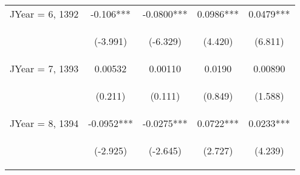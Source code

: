 \documentclass[]{standalone}
\begin{document}
\begin{tabular}{lcccc}
    JYear = 6, 1392  & -0.106***                                      & -0.0800***                                     & 0.0986***                                      & 0.0479***                                      \\
    \vspace{4pt}     & \begin{footnotesize}(-3.991)\end{footnotesize} & \begin{footnotesize}(-6.329)\end{footnotesize} & \begin{footnotesize}(4.420)\end{footnotesize}  & \begin{footnotesize}(6.811)\end{footnotesize}  \\
    JYear = 7, 1393  & 0.00532                                        & 0.00110                                        & 0.0190                                         & 0.00890                                        \\
    \vspace{4pt}     & \begin{footnotesize}(0.211)\end{footnotesize}  & \begin{footnotesize}(0.111)\end{footnotesize}  & \begin{footnotesize}(0.849)\end{footnotesize}  & \begin{footnotesize}(1.588)\end{footnotesize}  \\
    JYear = 8, 1394  & -0.0952***                                     & -0.0275***                                     & 0.0722***                                      & 0.0233***                                      \\
    \vspace{4pt}     & \begin{footnotesize}(-2.925)\end{footnotesize} & \begin{footnotesize}(-2.645)\end{footnotesize} & \begin{footnotesize}(2.727)\end{footnotesize}  & \begin{footnotesize}(4.239)\end{footnotesize}  \\

\end{tabular}
\end{document}
